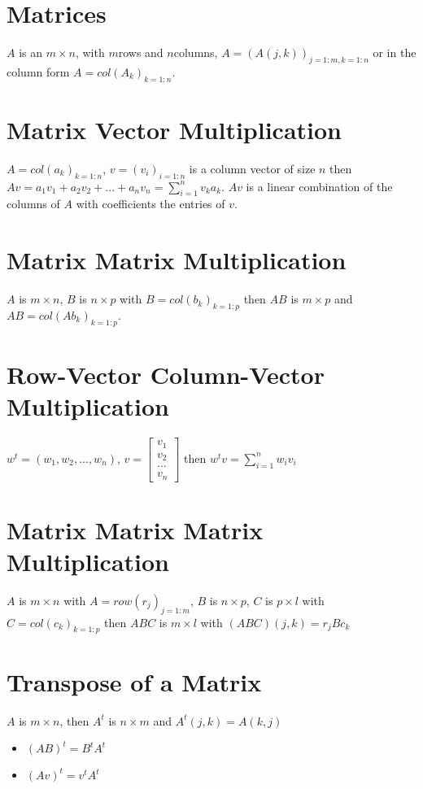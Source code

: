 \documentclass[12pt]{article}
\begin{document}
	\maketitle
	
\section{Matrices}
$A$ is an $m \times n$, with $m$rows and $n$columns, $A = (A(j,k))_{j=1:m, k=1:n}$ or in the column form $A=col(A_k)_{k=1:n}$.

\section{Matrix Vector Multiplication}
$A=col(a_k)_{k=1:n}$, $v = (v_i)_{i=1:n}$ is a column vector of size $n$ then $Av=a_1v_1+a_2v_2+...+a_nv_n=\sum_{i=1}^{n}v_ka_k$. $Av$ is a linear combination of the columns of $A$ with coefficients the entries of $v$.

\section{Matrix Matrix Multiplication}
$A$ is $m\times n$, $B$ is $n\times p$ with $B=col(b_k)_{k=1:p}$ then $AB$ is $m\times p$ and $AB=col(Ab_k)_{k=1:p}.$

\section{Row-Vector Column-Vector Multiplication}
$w^t = (w_1,w_2,...,w_n)$, $v=\begin{bmatrix}
	v_1 \\ v_2 \\ ... \\ v_n
\end{bmatrix}$ then $w^tv = \sum_{i=1}^{n}w_iv_i$

\section{Matrix Matrix Matrix Multiplication}
$A$ is $m\times n$ with $A=row(r_j)_{j=1:m}$, $B$ is $n \times p$, $C$ is $p\times l$ with $C=col(c_k)_{k=1:p}$ then $ABC$ is $m\times l$ with $(ABC)(j,k) = r_jBc_k$

\section{Transpose of a Matrix}
$A$ is $m\times n$, then $A^t$ is $n\times m$ and $A^t(j,k)=A(k,j)$
\begin{itemize}
	\item $(AB)^t = B^tA^t$
	\item $(Av)^t = v^tA^t$
\end{itemize}
\end{document}
